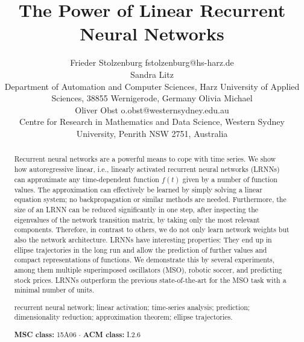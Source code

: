 \documentclass[twoside,11pt]{article}
\theoremstyle{definition}
\begin{document}
\title{The Power of Linear Recurrent Neural Networks}
\author{\name Frieder Stolzenburg \email fstolzenburg@hs-harz.de\\
	\name Sandra Litz\\
	\addr Department of Automation and Computer Sciences,
	Harz University of Applied Sciences,
	38855 Wernigerode, Germany
\AND	
	\name Olivia Michael\\
	\name Oliver Obst \email o.obst@westernsydney.edu.au\\
	\addr Centre for Research in Mathematics and Data Science,
	Western Sydney University,
	Penrith NSW 2751, Australia}
\editor{}
\maketitle

\begin{abstract}
Recurrent neural networks are a powerful means to cope with time series. We show
how autoregressive linear, i.e., linearly activated recurrent neural networks (LRNNs) can
approximate any time-dependent function $f(t)$ given by a number of function
values. The approximation can effectively be learned by simply solving a linear
equation system; no backpropagation or similar methods are needed. Furthermore,
the size of an LRNN can be reduced significantly in one step, after inspecting
the eigenvalues of the network transition matrix, by taking only the most
relevant components. Therefore, in contrast to others, we do not only
learn network weights but also the network architecture. LRNNs have interesting
properties: They end up in ellipse trajectories in the long run and allow the
prediction of further values and compact representations of functions. We
demonstrate this by several experiments, among them multiple superimposed
oscillators (MSO), robotic soccer, and predicting stock prices. LRNNs outperform
the previous state-of-the-art for the MSO task with a minimal number of units.

\smallskip
\begin{keywords}
recurrent neural network; linear activation; time-series analysis; prediction;
dimensionality reduction; approximation theorem; ellipse trajectories.
\end{keywords}

\smallskip
\noindent\textbf{MSC class:} 15A06 \;$\cdot$\; \textbf{ACM class:} I.2.6%
\end{abstract}
\end{document}
